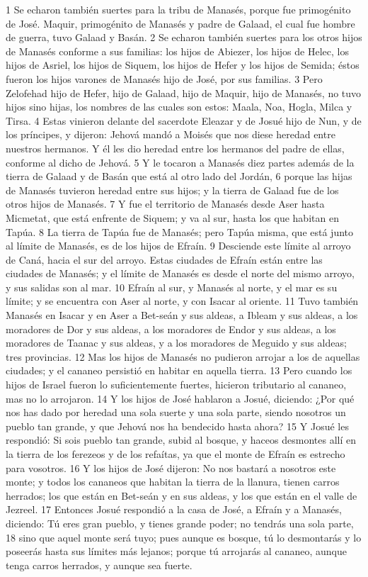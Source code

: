 1 Se echaron también suertes para la tribu de Manasés, porque fue primogénito de José. Maquir, primogénito de Manasés y padre de Galaad, el cual fue hombre de guerra, tuvo Galaad y Basán.
2 Se echaron también suertes para los otros hijos de Manasés conforme a sus familias: los hijos de Abiezer, los hijos de Helec, los hijos de Asriel, los hijos de Siquem, los hijos de Hefer y los hijos de Semida; éstos fueron los hijos varones de Manasés hijo de José, por sus familias.
3 Pero Zelofehad hijo de Hefer, hijo de Galaad, hijo de Maquir, hijo de Manasés, no tuvo hijos sino hijas, los nombres de las cuales son estos: Maala, Noa, Hogla, Milca y Tirsa.
4 Estas vinieron delante del sacerdote Eleazar y de Josué hijo de Nun, y de los príncipes, y dijeron: Jehová mandó a Moisés que nos diese heredad entre nuestros hermanos. Y él les dio heredad entre los hermanos del padre de ellas, conforme al dicho de Jehová.
5 Y le tocaron a Manasés diez partes además de la tierra de Galaad y de Basán que está al otro lado del Jordán,
6 porque las hijas de Manasés tuvieron heredad entre sus hijos; y la tierra de Galaad fue de los otros hijos de Manasés.
7 Y fue el territorio de Manasés desde Aser hasta Micmetat, que está enfrente de Siquem; y va al sur, hasta los que habitan en Tapúa.
8 La tierra de Tapúa fue de Manasés; pero Tapúa misma, que está junto al límite de Manasés, es de los hijos de Efraín.
9 Desciende este límite al arroyo de Caná, hacia el sur del arroyo. Estas ciudades de Efraín están entre las ciudades de Manasés; y el límite de Manasés es desde el norte del mismo arroyo, y sus salidas son al mar.
10 Efraín al sur, y Manasés al norte, y el mar es su límite; y se encuentra con Aser al norte, y con Isacar al oriente.
11 Tuvo también Manasés en Isacar y en Aser a Bet-seán y sus aldeas, a Ibleam y sus aldeas, a los moradores de Dor y sus aldeas, a los moradores de Endor y sus aldeas, a los moradores de Taanac y sus aldeas, y a los moradores de Meguido y sus aldeas; tres provincias.
12 Mas los hijos de Manasés no pudieron arrojar a los de aquellas ciudades; y el cananeo persistió en habitar en aquella tierra.
13 Pero cuando los hijos de Israel fueron lo suficientemente fuertes, hicieron tributario al cananeo, mas no lo arrojaron. 
14 Y los hijos de José hablaron a Josué, diciendo: ¿Por qué nos has dado por heredad una sola suerte y una sola parte, siendo nosotros un pueblo tan grande, y que Jehová nos ha bendecido hasta ahora?
15 Y Josué les respondió: Si sois pueblo tan grande, subid al bosque, y haceos desmontes allí en la tierra de los ferezeos y de los refaítas, ya que el monte de Efraín es estrecho para vosotros.
16 Y los hijos de José dijeron: No nos bastará a nosotros este monte; y todos los cananeos que habitan la tierra de la llanura, tienen carros herrados; los que están en Bet-seán y en sus aldeas, y los que están en el valle de Jezreel.
17 Entonces Josué respondió a la casa de José, a Efraín y a Manasés, diciendo: Tú eres gran pueblo, y tienes grande poder; no tendrás una sola parte,
18 sino que aquel monte será tuyo; pues aunque es bosque, tú lo desmontarás y lo poseerás hasta sus límites más lejanos; porque tú arrojarás al cananeo, aunque tenga carros herrados, y aunque sea fuerte.


